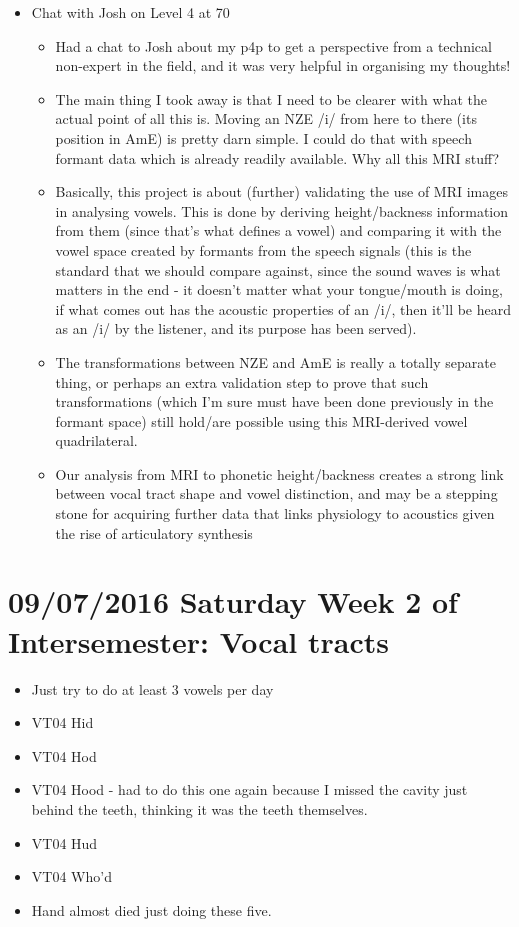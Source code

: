\documentclass{article}
\begin{document}
\begin{itemize}
    \item Chat with Josh on Level 4 at 70
    \begin{itemize}
        \item Had a chat to Josh about my p4p to get a perspective from a technical non-expert in the field, and it was very helpful in organising my thoughts!
        \item The main thing I took away is that I need to be clearer with what the actual point of all this is. Moving an NZE /i/ from here to there (its position in AmE) is pretty darn simple. I could do that with speech formant data which is already readily available. Why all this MRI stuff?
        \item Basically, this project is about (further) validating the use of MRI images in analysing vowels. This is done by deriving height/backness information from them (since that's what defines a vowel) and comparing it with the vowel space created by formants from the speech signals (this is the standard that we should compare against, since the sound waves is what matters in the end - it doesn't matter what your tongue/mouth is doing, if what comes out has the acoustic properties of an /i/, then it'll be heard as an /i/ by the listener, and its purpose has been served).
        \item The transformations between NZE and AmE is really a totally separate thing, or perhaps an extra validation step to prove that such transformations (which I'm sure must have been done previously in the formant space) still hold/are possible using this MRI-derived vowel quadrilateral.
        \item Our analysis from MRI to phonetic height/backness creates a strong link between vocal tract shape and vowel distinction, and may be a stepping stone for acquiring further data that links physiology to acoustics given the rise of articulatory synthesis
    \end{itemize}
        
\end{itemize}

\section*{09/07/2016 Saturday Week 2 of Intersemester: Vocal tracts}
\begin{itemize}
    \item Just try to do at least 3 vowels per day
    \item VT04 Hid
    \item VT04 Hod
    \item VT04 Hood - had to do this one again because I missed the cavity just behind the teeth, thinking it was the teeth themselves.
    \item VT04 Hud
    \item VT04 Who'd
    \item Hand almost died just doing these five.
\end{itemize}
\end{document}
